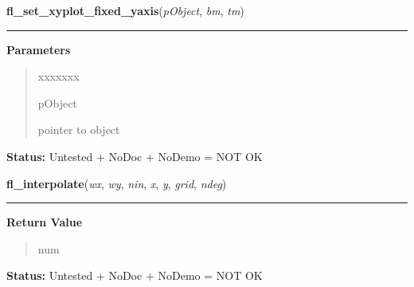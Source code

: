 \hspace{.8\funcindent}\begin{boxedminipage}{\funcwidth}

    \raggedright \textbf{fl\_set\_xyplot\_fixed\_yaxis}(\textit{pObject}, \textit{bm}, \textit{tm})

    \vspace{-1.5ex}

    \rule{\textwidth}{0.5\fboxrule}
\setlength{\parskip}{2ex}
\setlength{\parskip}{1ex}
      \textbf{Parameters}
      \vspace{-1ex}

      \begin{quote}
        \begin{Ventry}{xxxxxxx}

          \item[pObject]

          pointer to object

        \end{Ventry}

      \end{quote}

\textbf{Status:} Untested + NoDoc + NoDemo = NOT OK



    \end{boxedminipage}

    \label{xformslib:library:fl_interpolate}

    \vspace{0.5ex}

\hspace{.8\funcindent}\begin{boxedminipage}{\funcwidth}

    \raggedright \textbf{fl\_interpolate}(\textit{wx}, \textit{wy}, \textit{nin}, \textit{x}, \textit{y}, \textit{grid}, \textit{ndeg})

    \vspace{-1.5ex}

    \rule{\textwidth}{0.5\fboxrule}
\setlength{\parskip}{2ex}
\setlength{\parskip}{1ex}
      \textbf{Return Value}
    \vspace{-1ex}

      \begin{quote}
      num

      \end{quote}

\textbf{Status:} Untested + NoDoc + NoDemo = NOT OK



    \end{boxedminipage}

